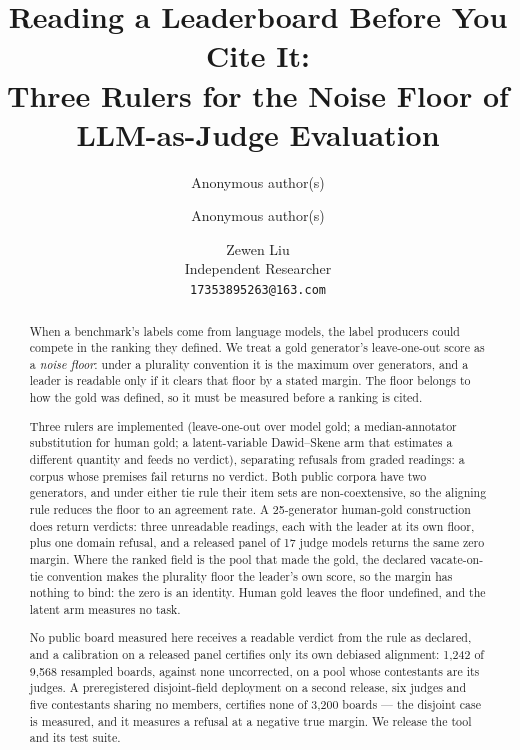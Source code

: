 \documentclass{article}
\title{\bfseries Reading a Leaderboard Before You Cite It:\\ Three Rulers for the Noise Floor of\\ LLM-as-Judge Evaluation}
\author{Anonymous author(s)}
\author{Anonymous author(s)}
\author{Zewen Liu \\ Independent Researcher \\ \texttt{17353895263@163.com}}
\date{}
\begin{document}
\maketitle
\begin{abstract}
\noindent When a benchmark's labels come from language models, the label producers could compete in the ranking they
defined. We treat a gold generator's leave-one-out score as a \emph{noise floor}: under a plurality convention it is
the maximum over generators, and a leader is readable only if it clears that floor by a stated margin. The floor belongs to how the gold was defined, so it must be measured before a ranking is cited.

Three rulers are implemented (leave-one-out over model gold; a median-annotator substitution for human gold; a
latent-variable Dawid--Skene arm that estimates a different quantity and feeds no verdict), separating refusals from graded readings: a corpus whose premises fail returns no verdict. Both public corpora have two generators, and under either tie rule their item sets are
non-coextensive, so the aligning rule reduces the floor to an agreement rate. A 25-generator human-gold construction does return verdicts:
three unreadable readings, each with the leader at its own floor, plus one domain refusal, and a released panel of 17 judge models returns the same zero margin. Where the ranked
field is the pool that made the gold, the declared \mbox{vacate-on-tie} convention makes the plurality floor the leader's own score, so the margin has nothing to bind: the zero is an identity. Human gold leaves the floor undefined, and the latent arm measures no task.

No public board measured here receives a readable verdict from the rule as declared, and a calibration on a released panel certifies only its own debiased
alignment: 1,242 of 9,568 resampled boards, against none uncorrected, on a pool whose contestants are its
judges. A preregistered disjoint-field deployment on a second release, six judges and five contestants sharing
no members, certifies none of 3,200 boards --- the disjoint case is measured, and it measures a refusal at a
negative true margin. We release the tool and its test suite.
\end{abstract}
\end{document}
